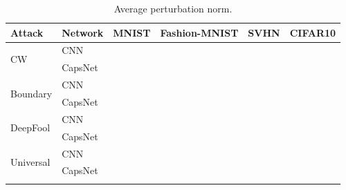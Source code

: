 \documentclass{article}
\begin{document}
\begin{table}[h]
	\centering
	\begin{tabular}{llcccc}
		\toprule
		Attack & Network       & MNIST & Fashion-MNIST & SVHN & CIFAR10  \\
		\midrule
		\multirow{2}{*}{CW} & CNN &  &  &  &  \\
		& CapsNet            &  &  &  &  \\
		\midrule
		\multirow{2}{*}{Boundary} & CNN &  &  &  &  \\
		& CapsNet            &  &  &  &  \\
		\midrule
		\multirow{2}{*}{DeepFool} & CNN &  &  &  &  \\
		& CapsNet           &  &  &  &  \\
		\midrule
		\multirow{2}{*}{Universal} & CNN &  &  &  &  \\
		& CapsNet           &  &  &  &  \\
		\bottomrule\\
	\end{tabular}
	\label{tab:norms}
	\caption{Average perturbation norm.}
\end{table}
\end{document}
